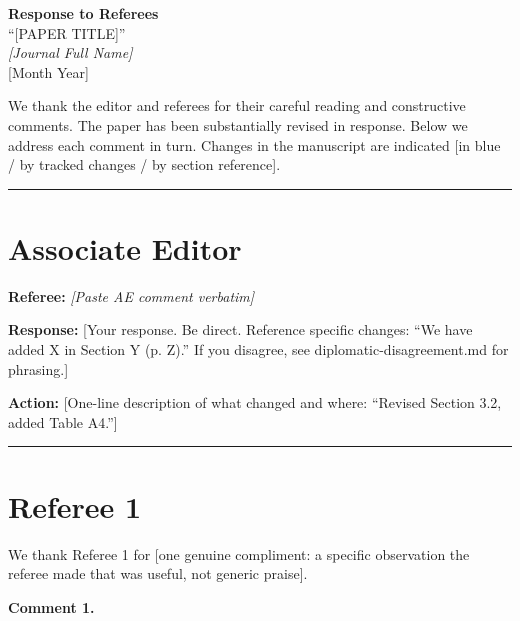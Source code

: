 \documentclass[12pt]{article}
\newcommand{\referee}[1]{%
  \vspace{0.5em}
  \noindent\textcolor{refcolor}{\textbf{Referee:}} \textit{\textcolor{refcolor}{#1}}
  \vspace{0.3em}
}
\newcommand{\response}[1]{%
  \noindent\textbf{Response:} #1
  \vspace{0.8em}
}
\newcommand{\action}[1]{%
  \noindent\textcolor{actioncolor}{\textbf{Action:} #1}
  \vspace{0.8em}
}
\begin{document}
\begin{center}
  {\large \textbf{Response to Referees}} \\[0.5em]
  ``[PAPER TITLE]'' \\[0.3em]
  \textit{[Journal Full Name]} \\[0.3em]
  [Month Year]
\end{center}

\vspace{1em}

We thank the editor and referees for their careful reading and constructive comments.
The paper has been substantially revised in response. Below we address each comment in turn.
Changes in the manuscript are indicated [in blue / by tracked changes / by section reference].

\vspace{1em}
\hrule
\vspace{1em}

\section*{Associate Editor}

\referee{[Paste AE comment verbatim]}

\response{[Your response. Be direct. Reference specific changes: ``We have added X in Section Y (p. Z).''
If you disagree, see diplomatic-disagreement.md for phrasing.]}

\action{[One-line description of what changed and where: ``Revised Section 3.2, added Table A4.'']}

\vspace{1em}
\hrule
\vspace{1em}

\section*{Referee 1}

\noindent We thank Referee 1 for [one genuine compliment: a specific observation the referee made
that was useful, not generic praise].

\vspace{0.5em}

\noindent \textbf{Comment 1.}
\end{document}

